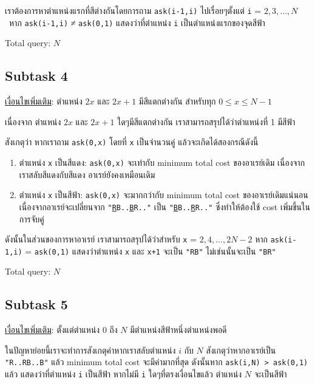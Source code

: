 \documentclass[12pt]{article}
\newcommand{\code}[1]{\texttt{\scriptsize{#1}}}
\begin{document}
เราต้องการหาตำแหน่งแรกที่สีต่างกันโดยการถาม \code{ask(i-1,i)} ไปเรื่อยๆตั้งแต่ \code{i} = $2, 3, ..., N$ \\\ หาก \code{ask(i-1,i)} ≠ \code{ask(0,1)} แสดงว่าที่ตำแหน่ง \code{i} เป็นตำแหน่งแรกของจุดสีฟ้า

Total query: $N$

\subsection{Subtask 4}

\underline{เงื่อนไขเพิ่มเติม}: ตำแหน่ง $2x$ และ $2x+1$ มีสีแตกต่างกัน สำหรับทุก $0 \leq x \leq N-1$

เนื่องจาก ตำแหน่ง $2x$ และ $2x+1$ ใดๆมีสีแตกต่างกัน เราสามารถสรุปได้ว่าตำแหน่งที่ 1 มีสีฟ้า %

สังเกตุว่า หากเราถาม \code{ask(0,x)} โดยที่ \code{x} เป็นจำนวนคู่ แล้วจะเกิดได้สองกรณีดังนี้

\begin{enumerate}
  \item ตำแหน่ง \code{x} เป็นสีแดง: \code{ask(0,x)} จะเท่ากับ minimum total cost ของอาเรย์เดิม เนื่องจากเราสลับสีแดงกับสีแดง อาเรย์ยังคงเหมือนเดิม
  \item ตำแหน่ง \code{x} เป็นสีฟ้า: \code{ask(0,x)} จะมากกว่ากับ minimum total cost ของอาเรย์เดิมแน่นอน เนื่องจากอาเรย์จะเปลี่ยนจาก \code{"\underline{R}B..\underline{B}R.."} เป็น \code{"\underline{B}B..\underline{R}R.."} ซึ่งทำให้ต้องใช้ cost เพิ่มขึ้นในการจับคู่ 
\end{enumerate}

ดังนั้นในส่วนของการหาอาเรย์ เราสามารถสรุปได้ว่าสำหรับ \code{x} = $2, 4, ..., 2N-2$ หาก \code{ask(i-1,i)} = \code{ask(0,1)} แสดงว่าตำแหน่ง \code{x} และ \code{x+1} จะเป็น \code{"RB"} ไม่เช่นนั้นจะเป็น \code{"BR"}

Total query: $N$

\subsection{Subtask 5}

\underline{เงื่อนไขเพิ่มเติม}: ตั้งแต่ตำแหน่ง $0$ ถึง $N$ มีตำแหน่งสีฟ้าหนึ่งตำแหน่งพอดี

ในปัญหาย่อยนี้เราจะทำการสังเกตุค่าหากเราสลับตำแหน่ง $i$ กับ $N$ สังเกตุว่าหากอาเรย์เป็น \code{"R..RB..B"} แล้ว minimum total cost จะมีค่ามากที่สุด ดังนั้นหาก \code{ask(i,N) > ask(0,1)} แล้ว แสดงว่าที่ตำแหน่ง \code{i} เป็นสีฟ้า หากไม่มี \code{i} ใดๆที่ตรงเงื่อนไขแล้ว ตำแหน่ง $N$ จะเป็นสีฟ้า
\end{document}
